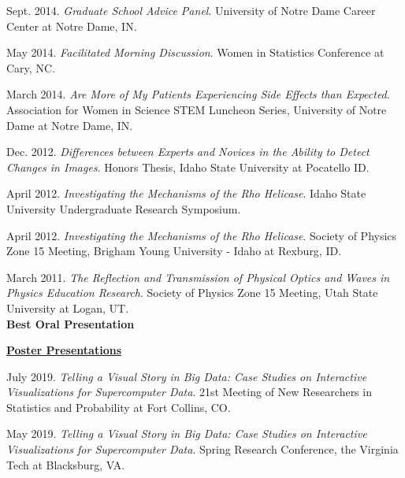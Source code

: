 \documentclass[11pt, letterpaper, roman]{moderncv} %
\begin{document}
\begin{etaremune}[topsep=0pt, itemsep=6pt, partopsep=0pt, parsep=0pt]
  \item Sept. 2014. \textit{Graduate School Advice Panel}.  University of Notre Dame Career Center at Notre Dame, IN.
  
  \item May 2014. \textit{Facilitated Morning Discussion}. Women in Statistics Conference at Cary, NC.
  
  \item March 2014. \textit{Are More of My Patients Experiencing Side Effects than Expected}. Association for Women in Science STEM Luncheon Series, University of Notre Dame at Notre Dame, IN.
  
  \item Dec. 2012. \textit{Differences between Experts and Novices in the Ability to Detect Changes in Images}. Honors Thesis, Idaho State University at Pocatello ID.

  \item April 2012. \textit{Investigating the Mechanisms of the Rho Helicase}. Idaho State University Undergraduate Research Symposium.

  \item April 2012. \textit{Investigating the Mechanisms of the Rho Helicase}. Society of Physics Zone 15 Meeting, Brigham Young University - Idaho at Rexburg, ID.

  \item March 2011. \textit{The Reflection and Transmission of Physical Optics and Waves in Physics Education Research}. Society of Physics Zone 15 Meeting, Utah State University at Logan, UT.\\
  \textbf{Best Oral Presentation}
  

\vspace{5pt}

\hspace{-0.30in}\underline{\textbf{\large Poster Presentations}}\normalsize
  \item July 2019. \textit{Telling a Visual Story in Big Data: Case Studies on Interactive Visualizations for Supercomputer Data}. 21st Meeting of New Researchers in Statistics and Probability at Fort Collins, CO.

  \item May 2019. \textit{Telling a Visual Story in Big Data: Case Studies on Interactive Visualizations for Supercomputer Data}. Spring Research Conference, the Virginia Tech at Blacksburg, VA.


\end{etaremune}
\end{document}
